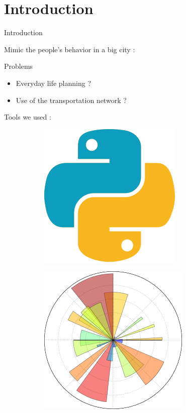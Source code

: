 \section{Introduction}

\begin{frame}[fragile]{Introduction}
	
	Mimic the people's behavior in a big city :
	\begin{alertblock}{Problems}
	\begin{itemize}
		\item Everyday life planning ?
		\item Use of the transportation network ?
	\end{itemize}
	\end{alertblock}
	Tools we used :
	\begin{figure}
		\centering
		\begin{subfigure}{.24\textwidth}
			\centering
			\includegraphics[width=.5\linewidth]{images/python.png}
		\end{subfigure}%
		\begin{subfigure}{.24\textwidth}
			\centering
			\includegraphics[width=.5\linewidth]{images/matplotlib.png}
		\end{subfigure}%
		\begin{subfigure}{.24\textwidth}

\end{subfigure}
\end{figure}
\end{frame}
